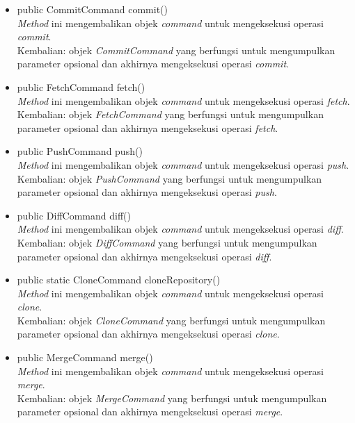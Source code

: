 \begin{itemize}
\item public CommitCommand commit()\\
\textit{Method} ini mengembalikan objek \textit{command} untuk mengeksekusi operasi \textit{commit}.\\
Kembalian: objek \textit{CommitCommand} yang berfungsi untuk mengumpulkan parameter opsional dan akhirnya mengeksekusi operasi \textit{commit}.

\item public FetchCommand fetch()\\
\textit{Method} ini mengembalikan objek \textit{command} untuk mengeksekusi operasi \textit{fetch}.\\
Kembalian: objek \textit{FetchCommand} yang berfungsi untuk mengumpulkan parameter opsional dan akhirnya mengeksekusi operasi \textit{fetch}.

\item public PushCommand push()\\
\textit{Method} ini mengembalikan objek \textit{command} untuk mengeksekusi operasi \textit{push}.\\
Kembalian: objek \textit{PushCommand} yang berfungsi untuk mengumpulkan parameter opsional dan akhirnya mengeksekusi operasi \textit{push}.

\item public DiffCommand diff()\\
\textit{Method} ini mengembalikan objek \textit{command} untuk mengeksekusi operasi \textit{diff}.\\
Kembalian: objek \textit{DiffCommand} yang berfungsi untuk mengumpulkan parameter opsional dan akhirnya mengeksekusi operasi \textit{diff}.

\item public static CloneCommand cloneRepository()\\
\textit{Method} ini mengembalikan objek \textit{command} untuk mengeksekusi operasi \textit{clone}.\\
Kembalian: objek \textit{CloneCommand} yang berfungsi untuk mengumpulkan parameter opsional dan akhirnya mengeksekusi operasi \textit{clone}.

\item public MergeCommand merge()\\
\textit{Method} ini mengembalikan objek \textit{command} untuk mengeksekusi operasi \textit{merge}.\\
Kembalian: objek \textit{MergeCommand} yang berfungsi untuk mengumpulkan parameter opsional dan akhirnya mengeksekusi operasi \textit{merge}.


\end{itemize}
